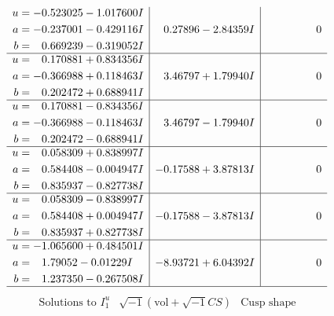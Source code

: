 \documentclass[1p]{elsarticle_modified}
\theoremstyle{definition}
\newcommand{\I}{\sqrt{-1}}
\begin{document}
$$\begin{array}{c|c|c}
\begin{aligned}
u &= -0.523025 - 1.017600 I \\
a &= -0.237001 - 0.429116 I \\
b &= \phantom{-}0.669239 - 0.319052 I\end{aligned}
 & \phantom{-}0.27896 - 2.84359 I & \phantom{-0.000000 } 0 \\ \hline\begin{aligned}
u &= \phantom{-}0.170881 + 0.834356 I \\
a &= -0.366988 + 0.118463 I \\
b &= \phantom{-}0.202472 + 0.688941 I\end{aligned}
 & \phantom{-}3.46797 + 1.79940 I & \phantom{-0.000000 } 0 \\ \hline\begin{aligned}
u &= \phantom{-}0.170881 - 0.834356 I \\
a &= -0.366988 - 0.118463 I \\
b &= \phantom{-}0.202472 - 0.688941 I\end{aligned}
 & \phantom{-}3.46797 - 1.79940 I & \phantom{-0.000000 } 0 \\ \hline\begin{aligned}
u &= \phantom{-}0.058309 + 0.838997 I \\
a &= \phantom{-}0.584408 - 0.004947 I \\
b &= \phantom{-}0.835937 - 0.827738 I\end{aligned}
 & -0.17588 + 3.87813 I & \phantom{-0.000000 } 0 \\ \hline\begin{aligned}
u &= \phantom{-}0.058309 - 0.838997 I \\
a &= \phantom{-}0.584408 + 0.004947 I \\
b &= \phantom{-}0.835937 + 0.827738 I\end{aligned}
 & -0.17588 - 3.87813 I & \phantom{-0.000000 } 0 \\ \hline\begin{aligned}
u &= -1.065600 + 0.484501 I \\
a &= \phantom{-}1.79052 - 0.01229 I \\
b &= \phantom{-}1.237350 - 0.267508 I\end{aligned}
 & -8.93721 + 6.04392 I & \phantom{-0.000000 } 0\\
 \hline 
 \end{array}$$\newpage$$\begin{array}{c|c|c}  
\text{Solutions to }I^u_{1}& \I (\text{vol} + \sqrt{-1}CS) & \text{Cusp shape}\\

\end{array}$$
\end{document}
